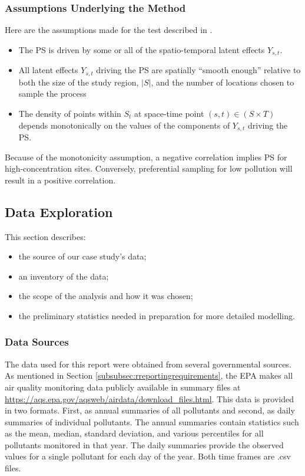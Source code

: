 \subsubsection*{Assumptions Underlying the Method}
\label{subsubsec:underlyingassumps}
Here are the assumptions made for the test described in \cite{watson2020}.
\begin{itemize}
\item The \ac{PS} is driven by some or all of the spatio-temporal latent effects $Y_{s,t}$.
\item  All latent effects $Y_{s,t}$ driving the \ac{PS} are spatially ``smooth enough'' relative to both the size of the study region, $|S|$, and the number of locations chosen to sample the process
\item The density of points within $S_t$ at space-time point $(s,t) \in (S \times T)$ depends monotonically on the values of the components of $Y_{s,t}$ driving the \ac{PS}.
\end{itemize}

Because of the monotonicity assumption, a negative correlation implies \ac{PS} for high-concentration sites.  Conversely, preferential sampling for low pollution will result in a positive correlation.

%
\subsection{Data Exploration}
\label{subsec:EDA}
This section describes:
\begin{itemize}
\item the source of our case study's data;
\item an inventory of the data;
\item the scope of the analysis and how it was chosen;
\item the preliminary statistics needed in preparation for more detailed modelling.
\end{itemize}

\subsubsection*{Data Sources}\label{subsec:datasources}
The data used for this report were obtained from several governmental sources. As mentioned in Section \ref{subsubsec:rreportingrequirements}, the \ac{EPA} makes all air quality monitoring data publicly available in summary files at \url{https://aqs.epa.gov/aqsweb/airdata/download_files.html}.  This data is provided in two formats.  First, as annual summaries of all pollutants and second, as daily summaries of individual pollutants.  The annual summaries contain statistics such as the mean, median, standard deviation, and various percentiles for all pollutants monitored in that year.  The daily summaries provide the observed values for a single pollutant for each day of the year.  Both time frames are .csv files.

